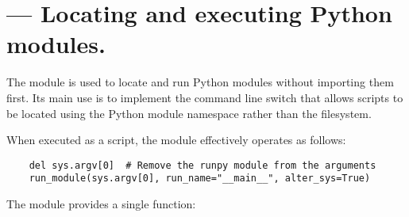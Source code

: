 \section{ ---
         Locating and executing Python modules.}





The  module is used to locate and run Python modules
without importing them first. Its main use is to implement the
 command line switch that allows scripts to be located
using the Python module namespace rather than the filesystem.

When executed as a script, the module effectively operates as follows:
\begin{verbatim}
    del sys.argv[0]  # Remove the runpy module from the arguments
    run_module(sys.argv[0], run_name="__main__", alter_sys=True)
\end{verbatim}

The  module provides a single function:

